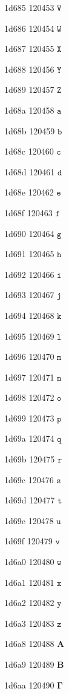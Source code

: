 \documentclass[11pt]{article}
\begin{document}
1d685 120453 \ensuremath{\mathtt{V}}

1d686 120454 \ensuremath{\mathtt{W}}

1d687 120455 \ensuremath{\mathtt{X}}

1d688 120456 \ensuremath{\mathtt{Y}}

1d689 120457 \ensuremath{\mathtt{Z}}

1d68a 120458 \ensuremath{\mathtt{a}}

1d68b 120459 \ensuremath{\mathtt{b}}

1d68c 120460 \ensuremath{\mathtt{c}}

1d68d 120461 \ensuremath{\mathtt{d}}

1d68e 120462 \ensuremath{\mathtt{e}}

1d68f 120463 \ensuremath{\mathtt{f}}

1d690 120464 \ensuremath{\mathtt{g}}

1d691 120465 \ensuremath{\mathtt{h}}

1d692 120466 \ensuremath{\mathtt{i}}

1d693 120467 \ensuremath{\mathtt{j}}

1d694 120468 \ensuremath{\mathtt{k}}

1d695 120469 \ensuremath{\mathtt{l}}

1d696 120470 \ensuremath{\mathtt{m}}

1d697 120471 \ensuremath{\mathtt{n}}

1d698 120472 \ensuremath{\mathtt{o}}

1d699 120473 \ensuremath{\mathtt{p}}

1d69a 120474 \ensuremath{\mathtt{q}}

1d69b 120475 \ensuremath{\mathtt{r}}

1d69c 120476 \ensuremath{\mathtt{s}}

1d69d 120477 \ensuremath{\mathtt{t}}

1d69e 120478 \ensuremath{\mathtt{u}}

1d69f 120479 \ensuremath{\mathtt{v}}

1d6a0 120480 \ensuremath{\mathtt{w}}

1d6a1 120481 \ensuremath{\mathtt{x}}

1d6a2 120482 \ensuremath{\mathtt{y}}

1d6a3 120483 \ensuremath{\mathtt{z}}

1d6a8 120488 \ensuremath{\mathbf{{A}}}

1d6a9 120489 \ensuremath{\mathbf{{B}}}

1d6aa 120490 \ensuremath{\mathbf{\Gamma}}
\end{document}

